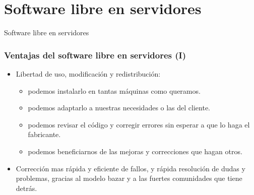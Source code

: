 \documentclass{beamer}
\begin{document}
\section{Software libre en servidores}

\begin{frame}

\begin{center}
\huge{Software libre en servidores}
\end{center}

\end{frame}




\begin{frame}
\frametitle{Ventajas del software libre en servidores (I)}

\begin{itemize}
\item Libertad de uso, modificación y redistribución: 
	\begin{itemize}
	\item podemos \alert{instalarlo} en tantas máquinas como queramos.
	\item podemos \alert{adaptarlo} a nuestras necesidades o las del cliente.
	\item podemos revisar el código y \alert{corregir} errores sin esperar a que lo haga el fabricante.
	\item podemos beneficiarnos de las mejoras y correcciones que hagan otros.
	\end{itemize}

\item  Corrección mas rápida y eficiente de fallos, y rápida resolución de dudas y problemas, gracias al \alert{modelo bazar} y a las fuertes comunidades que tiene detrás.

\end{itemize}
\end{frame}

\end{document}
